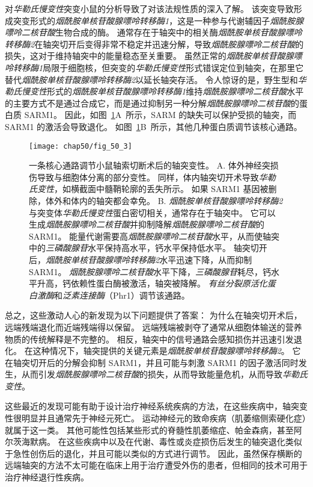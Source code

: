 对\textit{华勒氏慢变性}突变小鼠的分析导致了对该法规性质的深入了解。
该突变导致形成突变形式的\textit{烟酰胺单核苷酸腺嘌呤转移酶1}，这是一种参与代谢辅因子\textit{烟酰胺腺嘌呤二核苷酸}生物合成的酶。
通常存在于轴突中的相关酶\textit{烟酰胺单核苷酸腺嘌呤转移酶2}在轴突切开后变得非常不稳定并迅速分解，导致\textit{烟酰胺腺嘌呤二核苷酸}的损失，这对于维持轴突中的能量稳态至关重要。
虽然正常的\textit{烟酰胺单核苷酸腺嘌呤转移酶1}局限于细胞核，但突变的\textit{华勒氏慢变性}形式错误定位到轴突，在那里它替代\textit{烟酰胺单核苷酸腺嘌呤转移酶2}以延长轴突存活。
令人惊讶的是，野生型和\textit{华勒氏慢变性}形式的\textit{烟酰胺单核苷酸腺嘌呤转移酶1}维持\textit{烟酰胺腺嘌呤二核苷酸}水平的主要方式不是通过合成它，而是通过抑制另一种分解\textit{烟酰胺腺嘌呤二核苷酸}的蛋白质 SARM1。
因此，如图~\ref{fig:50_3}A~所示，SARM 的缺失可以保护受损的轴突，而 SARM1 的激活会导致退化。
如图~\ref{fig:50_3}B~所示，其他几种蛋白质调节该核心通路。


\begin{figure}[htbp]
	\centering
	\texttt{[image: chap50/fig\_50\_3]}
	\caption{一条核心通路调节小鼠轴索切断术后的轴突变性。
		A. 体外神经突损伤导致与细胞体分离的部分变性。
		同样，体内轴突切开术导致\textit{华勒氏变性}，如横截面中髓鞘轮廓的丢失所示。
		如果 SARM1 基因被删除，体外和体内的轴突都会幸免。
		B. \textit{烟酰胺单核苷酸腺嘌呤转移酶2}与突变体\textit{华勒氏慢变性}蛋白密切相关，通常存在于轴突中。
		它可以生成\textit{烟酰胺腺嘌呤二核苷酸}并抑制降解\textit{烟酰胺腺嘌呤二核苷酸}的 SARM1。
		能量代谢需要高\textit{烟酰胺腺嘌呤二核苷酸}水平，从而使轴突中的\textit{三磷酸腺苷}水平保持高水平，钙水平保持低水平。
		轴突切开后，\textit{烟酰胺单核苷酸腺嘌呤转移酶2}水平迅速下降，从而抑制 SARM1。
		\textit{烟酰胺腺嘌呤二核苷酸}水平下降，\textit{三磷酸腺苷}耗尽，钙水平升高，钙依赖性蛋白酶被激活，轴突被降解。
		\textit{有丝分裂原活化蛋白激酶}和\textit{泛素连接酶}（Phr1）调节该通路。}
	\label{fig:50_3}
\end{figure}


总之，这些激动人心的新发现为以下问题提供了答案：
为什么在轴突切开术后，远端残端退化而近端残端得以保留。
远端残端被剥夺了通常从细胞体输送的营养物质的传统解释是不完整的。
相反，轴突中的信号通路会感知损伤并迅速引发退化。
在这种情况下，轴突提供的关键元素是\textit{烟酰胺单核苷酸腺嘌呤转移酶2}。
它在轴突切开后的分解会抑制 SARM1，并且可能与刺激 SARM1 的因子激活同时发生，从而引发\textit{烟酰胺腺嘌呤二核苷酸}的损失，从而导致能量危机，从而导致\textit{华勒氏变性}。


这些最近的发现可能有助于设计治疗神经系统疾病的方法，在这些疾病中，轴突变性很明显并且通常先于神经元死亡。
运动神经元的致命疾病（肌萎缩侧索硬化症）就属于这一类。
其他可能性包括某些形式的脊髓性肌萎缩症、帕金森病，甚至阿尔茨海默病。
在这些疾病中以及在代谢、毒性或炎症损伤后发生的轴突退化类似于急性创伤后的退化，并且可能以类似的方式进行调节。
因此，虽然保存横断的远端轴突的方法不太可能在临床上用于治疗遭受外伤的患者，但相同的技术可用于治疗神经退行性疾病。


